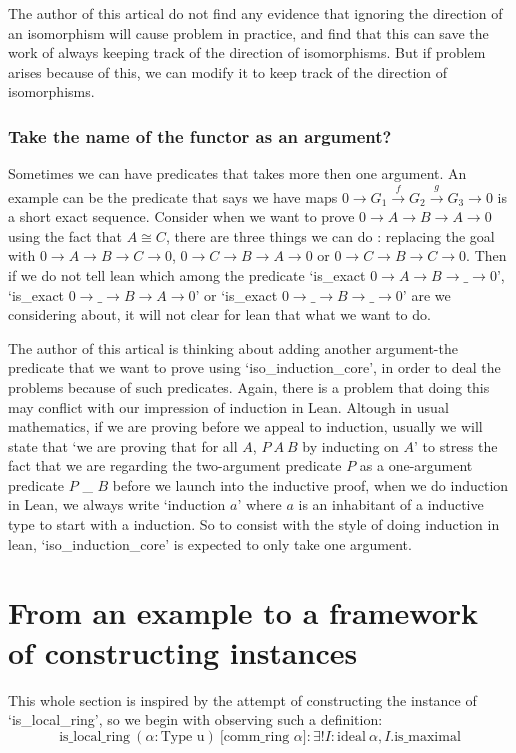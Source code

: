 \documentclass[11pt]{article}
\begin{document}
The author of this artical do not find any evidence that ignoring the direction of an isomorphism will cause problem in practice, and find that this can save the work of always keeping track of the direction of isomorphisms. But if problem arises because of this, we can modify it to keep track of the direction of isomorphisms.

\subsubsection{Take the name of the functor as an argument?}

Sometimes we can have predicates that takes more then one argument. An example can be the predicate that says we have maps $0\to G_1\overset{f}\to G_2 \overset{g}\to G_3\to 0$ is a short exact sequence. Consider when we want to prove $0\to A \to B \to A\to 0$ using the fact that $A\cong C$, there are three things we can do : replacing the goal with $0\to A \to B \to C\to 0$, $0\to C \to B \to A\to 0$ or $0\to C \to B \to C\to 0$. Then if we do not tell lean which among the predicate `is\_exact $0 \to A \to B \to \_ \to 0$', `is\_exact $0 \to \_ \to B \to A \to 0$' or `is\_exact $0 \to \_ \to B \to \_ \to 0$' are we considering about, it will not clear for lean that what we want to do. 

The author of this artical is thinking about adding another argument-the predicate that we want to prove using `iso\_induction\_core', in order to deal the problems because of such predicates. Again, there is a problem that doing this may conflict with our impression of induction in Lean. Altough in usual mathematics, if we are proving before we appeal to induction, usually we will state that `we are proving that for all $A$, $P \ A \ B$ by inducting on $A$' to stress the fact that we are regarding the two-argument predicate $P$ as a one-argument predicate $P$ \_ $B$ before we launch into the inductive proof, when we do induction in Lean, we always write `induction $a$' where $a$ is an inhabitant of a inductive type to start with a induction. So to consist with the style of doing induction in lean, `iso\_induction\_core' is expected to only take one argument.

\section{From an example to a framework of constructing instances}

This whole section is inspired by the attempt of constructing the instance of `is\_local\_ring', so we begin with observing such a definition:
\[\text{is\_local\_ring} \ (\alpha : \text{Type u}) \  \text{[comm\_ring $\alpha$]} : \exists ! I : \text{ideal} \ \alpha, I.\text{is\_maximal}\]
\end{document}
